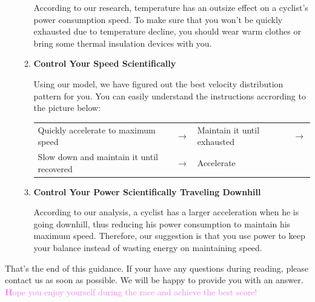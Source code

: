 \documentclass{article}
\newcommand{\itembf}{\item \textbf}
\newcommand{\violetbf}[1]{\textcolor{violet}{\textbf #1}}
\begin{document}
\begin{itemize}
\begin{enumerate}
			According to our research, temperature has an outsize effect on a cyclist's power consumption speed. To make sure that you won't be quickly exhausted due to temperature decline, you should wear warm clothes or bring some thermal insulation devices with you.
		\itembf{Control Your Speed Scientifically}

			Using our model, we have figured out the best velocity distribution pattern for you. You can easily understand the instructions accrording to the picture below:
			\begin{center}
			\begin{tabular}{llll}
				Quickly accelerate to maximum speed&$\rightarrow$&Maintain it until exhausted&$\rightarrow$\\
				Slow down and maintain it until recovered&$\rightarrow$&Accelerate&~\\
			\end{tabular}
			\end{center}
		\itembf{Control Your Power Scientifically Traveling Downhill}

			According to our analysis, a cyclist has a larger acceleration when he is going downhill, thus reducing his power consumption to maintain his maximum speed. Therefore, our suggestion is that you use power to keep your balance instead of wasting energy on maintaining speed.
	\end{enumerate}
	\end{itemize}
	That's the end of this guidance. If your have any questions during reading, please contact us as soon as possible. We will be happy to provide you with an answer. \violetbf{Hope you enjoy yourself during the race and achieve the best score!}
\end{document}
